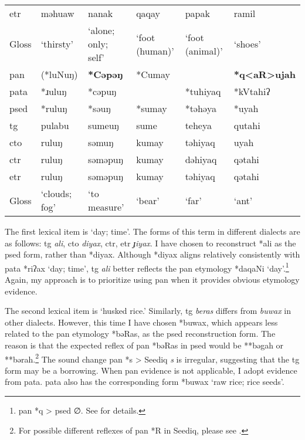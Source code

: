 \begin{table}[!htbp]
\begin{tabular}{l>{\raggedright\arraybackslash}p{2cm}>{\raggedright\arraybackslash}p{2cm}>{\raggedright\arraybackslash}p{2cm}>{\raggedright\arraybackslash}p{2cm}>{\raggedright\arraybackslash}p{2cm}}
\acs{etr}  & məhuaw        & nanak               & qaqay          & papak           & ramil                   \\
Gloss      & `thirsty'     & `alone; only; self' & `foot (human)' & `foot (animal)' & `shoes'                 \\ \hline\hline
\acs{pan}  & (*luNuŋ)       & \textbf{*Cəpəŋ}              & *Cumay         &                 & \textbf{*q<aR>ujah}              \\ 
\acs{pata} & *ɹuluŋ        & *cəpuŋ              &                & *tuhiyaq        & *kVtahiʔ                \\ 
\acs{psed} & *ruluŋ        & *səuŋ            & *sumay         & *təhəya         & *uyah                   \\ \hdashline
\acs{tg}   & pulabu        & sumeuŋ              & sume           & teheya          & qutahi                  \\
\acs{cto}  & ruluŋ         & səmuŋ               & kumay          & təhiyaq         & uyah                    \\
\acs{ctr}  & ruluŋ         & səməpuŋ             & kumay          & dəhiyaq         & qətahi                  \\
\acs{etr}  & ruluŋ         & səməpuŋ             & kumay          & təhiyaq         & qətahi                  \\
Gloss      & `clouds; fog' & `to measure'        & `bear'         & `far'           & `ant'                   \\ \hline
\end{tabular}
\end{table}
\endgroup

The first lexical item is `day; time'. The forms of this term in different dialects are as follows: \acl{tg} \textit{ali}, \acl{cto} \textit{diyax}, \acl{ctr}, \acl{etr} \textit{ɟiyax}. I have chosen to reconstruct *ali as the \acl{psed} form, rather than *diyax. Although *diyax aligns relatively consistently with \acl{pata} *riʔax `day; time', \acl{tg} \textit{ali} better reflects the \acl{pan} etymology *daqaNi `day'.\footnote{\acs{pan} *q > \acs{psed} ∅. See \textcite{song2024sedq} for details.} Again, my approach is to prioritize using \acl{pan} when it provides obvious etymology evidence.

The second lexical item is `husked rice.' Similarly, \acl{tg} \textit{beras} differs from \textit{buwax} in other dialects. However, this time I have chosen *buwax, which appears less related to the \acs{pan} etymology *bəRas, as the \acl{psed} reconstruction form. The reason is that the expected reflex of \acs{pan} *bəRas in \acl{psed} would be **bəgah or **bərah.\footnote{For possible different reflexes of \acs{pan} *R in Seediq, please see \textcite{song2024Aicg}.} The sound change \acs{pan} *s > Seediq \textit{s} is irregular, suggesting that the \acl{tg} form may be a borrowing. When \acs{pan} evidence is not applicable, I adopt evidence from \acl{pata}. \acl{pata} also has the corresponding form *buwax `raw rice; rice seeds'.

